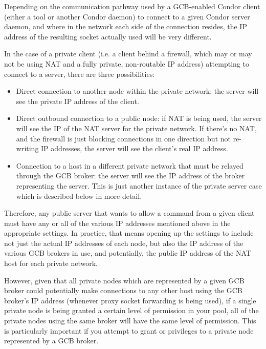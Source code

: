 Depending on the communication pathway used by a GCB-enabled Condor
client (either a tool or another Condor daemon) to connect to a given
Condor server daemon, and where in the network each side of the
connection resides, the IP address of the resulting socket actually
used will be very different.

In the case of a private client (i.e. a client behind a firewall,
which may or may not be using NAT and a fully private, non-routable IP
address) attempting to connect to a server, there are three
possibilities: 

\begin{itemize}

  \item Direct connection to another node within the private network:
  the server will see the private IP address of the client.

  \item Direct outbound connection to a public node: if NAT is being
  used, the server will see the IP of the NAT server for the private
  network.
  If there's no NAT, and the firewall is just blocking connections in
  one direction but not re-writing IP addresses, the server will see
  the client's real IP address.

  \item Connection to a host in a different private network that must
  be relayed through the GCB broker: the server will see the IP
  address of the broker representing the server.
  This is just another instance of the private server case which is
  described below in more detail.

\end{itemize}

Therefore, any public server that wants to allow a command from a
given client must have any or all of the various IP addresses
mentioned above in the appropriate  settings.  In
practice, that means opening up the  settings to
include not just the actual IP addresses of each node, but also the IP
address of the various GCB brokers in use, and potentially, the public
IP address of the NAT host for each private network.

However, given that all private nodes which are represented by a
given GCB broker could potentially make connections to any other
host using the GCB broker's IP address (whenever proxy socket
forwarding is being used), if a single private node is being granted
a certain level of permission in your pool, all of the private nodes
using the same broker will have the same level of permission.
This is particularly important if you attempt to grant
 or 
privileges to a private node represented by a GCB broker.

